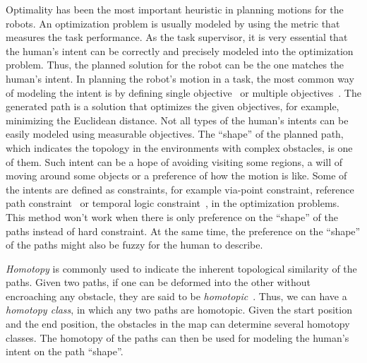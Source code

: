\documentclass[letterpaper, 10 pt, conference]{ieeeconf}
\begin{document}
Optimality has been the most important heuristic in planning motions for the robots.
An optimization problem is usually modeled by using the metric that measures the task performance.
As the task supervisor, it is very essential that the human's intent can be correctly and precisely modeled into the optimization problem.
Thus, the planned solution for the robot can be the one matches the human's intent.
In planning the robot's motion in a task, the most common way of modeling the intent is by defining single objective~\cite{6974170} or multiple objectives~\cite{yi2014supporting}.
The generated path is a solution that optimizes the given objectives, for example, minimizing the Euclidean distance.
Not all types of the human's intents can be easily modeled using measurable objectives.
The ``shape'' of the planned path, which indicates the topology in the environments with complex obstacles, is one of them.
Such intent can be a hope of avoiding visiting some regions, a will of moving around some objects or a preference of how the motion is like.
Some of the intents are defined as constraints, for example via-point constraint, reference path constraint~\cite{6974170} or temporal logic constraint~\cite{5650896}, in the optimization problems.
This method won't work when there is only preference on the ``shape'' of the paths instead of hard constraint.
At the same time, the preference on the ``shape'' of the paths might also be fuzzy for the human to describe.

\emph{Homotopy} is commonly used to indicate the inherent topological similarity of the paths.
Given two paths, if one can be deformed into the other without encroaching any obstacle, they are said to be \emph{homotopic}~\cite{Hernandez201544}.
Thus, we can have a \emph{homotopy class}, in which any two paths are homotopic.
Given the start position and the end position, the obstacles in the map can determine several homotopy classes.
The homotopy of the paths can then be used for modeling the human's intent on the path ``shape''. 
\end{document}
